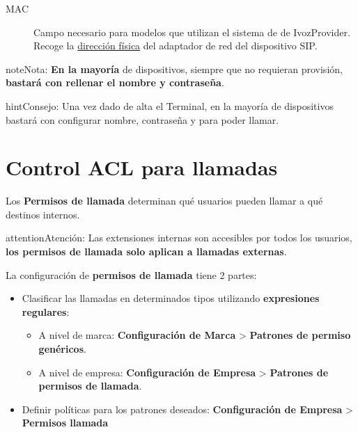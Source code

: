 \documentclass[letterpaper,10pt,spanish]{sphinxmanual}
\begin{document}
\begin{description}
\item[{MAC}] \leavevmode{}\label{pbx_features/terminals:term-mac}
Campo necesario para modelos que utilizan el sistema de {\hyperref[provisioning/index:provisioning]{}} de IvozProvider. Recoge la \href{https://es.wikipedia.org/wiki/Direcci\%C3\%B3n\_MAC}{dirección física} del adaptador de red del dispositivo SIP.

\end{description}

\begin{notice}{note}{Nota:}
\textbf{En la mayoría} de dispositivos, siempre que no requieran provisión, \textbf{bastará con rellenar el nombre y contraseña}.
\end{notice}

\begin{notice}{hint}{Consejo:}
Una vez dado de alta el Terminal, en la mayoría de dispositivos bastará con configurar nombre, contraseña y {\hyperref[internal_calls/brand_portal:domain\string-per\string-company]{}} para poder llamar.
\end{notice}


\section{Control ACL para llamadas}
\label{pbx_features/call_permissions:call-permissions}\label{pbx_features/call_permissions::doc}\label{pbx_features/call_permissions:call-acl-control}
Los \textbf{Permisos de llamada} determinan qué usuarios pueden llamar a qué destinos internos.

\begin{notice}{attention}{Atención:}
Las extensiones internas son accesibles por todos los usuarios, \textbf{los permisos de llamada solo aplican a llamadas externas}.
\end{notice}

La configuración de \textbf{permisos de llamada} tiene 2 partes:
\begin{itemize}
\item {} 
Clasificar las llamadas en determinados tipos utilizando \textbf{expresiones regulares}:
\begin{itemize}
\item {} 
A nivel de marca: \textbf{Configuración de Marca} \textgreater{} \textbf{Patrones de permiso genéricos}.

\item {} 
A nivel de empresa: \textbf{Configuración de Empresa} \textgreater{} \textbf{Patrones de permisos de llamada}.

\end{itemize}

\item {} 
Definir políticas para los patrones deseados: \textbf{Configuración de Empresa} \textgreater{} \textbf{Permisos llamada}

\end{itemize}
\end{document}
